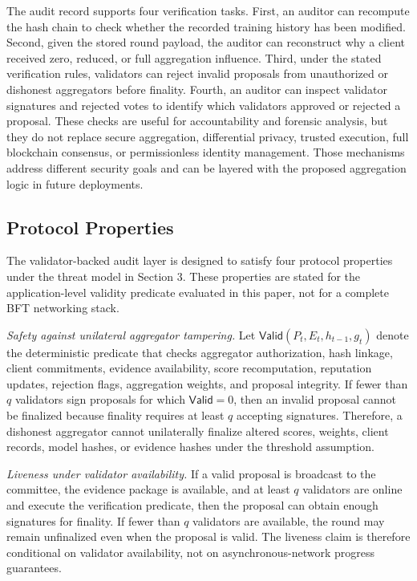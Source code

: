 \documentclass[preprint,12pt]{elsarticle}
\begin{document}
The audit record supports four verification tasks. First, an auditor can recompute the hash chain to check whether the recorded training history has been modified. Second, given the stored round payload, the auditor can reconstruct why a client received zero, reduced, or full aggregation influence. Third, under the stated verification rules, validators can reject invalid proposals from unauthorized or dishonest aggregators before finality. Fourth, an auditor can inspect validator signatures and rejected votes to identify which validators approved or rejected a proposal. These checks are useful for accountability and forensic analysis, but they do not replace secure aggregation, differential privacy, trusted execution, full blockchain consensus, or permissionless identity management. Those mechanisms address different security goals and can be layered with the proposed aggregation logic in future deployments.

\subsection{Protocol Properties}

The validator-backed audit layer is designed to satisfy four protocol properties under the threat model in Section 3. These properties are stated for the application-level validity predicate evaluated in this paper, not for a complete BFT networking stack.

\emph{Safety against unilateral aggregator tampering.} Let $\mathsf{Valid}(P_t,E_t,h_{t-1},g_t)$ denote the deterministic predicate that checks aggregator authorization, hash linkage, client commitments, evidence availability, score recomputation, reputation updates, rejection flags, aggregation weights, and proposal integrity. If fewer than $q$ validators sign proposals for which $\mathsf{Valid}=0$, then an invalid proposal cannot be finalized because finality requires at least $q$ accepting signatures. Therefore, a dishonest aggregator cannot unilaterally finalize altered scores, weights, client records, model hashes, or evidence hashes under the threshold assumption.

\emph{Liveness under validator availability.} If a valid proposal is broadcast to the committee, the evidence package is available, and at least $q$ validators are online and execute the verification predicate, then the proposal can obtain enough signatures for finality. If fewer than $q$ validators are available, the round may remain unfinalized even when the proposal is valid. The liveness claim is therefore conditional on validator availability, not on asynchronous-network progress guarantees.
\end{document}
